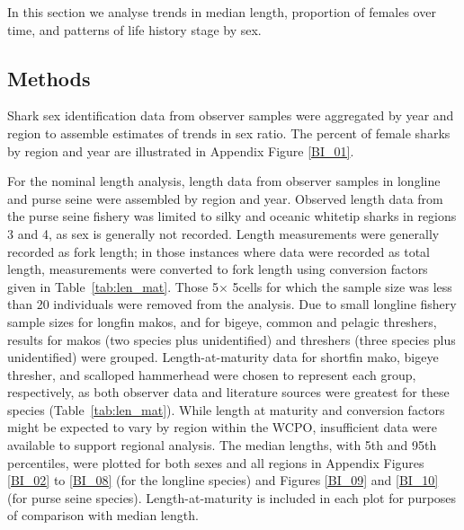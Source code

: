 \documentclass[12pt]{SCreport}
\begin{document}
In this section we analyse trends in median length, proportion of females over time, and patterns of life history stage by sex.  
      

\subsection{Methods}\label{bi:methods}
Shark sex identification data from observer samples were aggregated by year and region to assemble estimates of trends in sex ratio.  The percent of female sharks by region and year are illustrated in Appendix Figure \ref{BI_01}.
  
For the nominal length analysis, length data from observer samples in longline and purse seine were assembled by region and year.  Observed length data from the purse seine fishery was limited to silky and oceanic whitetip sharks in regions 3 and 4, as sex is generally not recorded.  Length measurements were generally recorded as fork length; in those instances where data were recorded as total length, measurements were converted to fork length using conversion factors given in Table~\ref{tab:len_mat}. Those 5\degree $\times$ 5\degree cells for which the sample size was less than 20 individuals were removed from the analysis.  Due to small longline fishery sample sizes for longfin makos, and for bigeye, common and pelagic threshers, results for makos (two species plus unidentified) and threshers (three species plus unidentified) were grouped. Length-at-maturity data for shortfin mako, bigeye thresher, and scalloped hammerhead were chosen to represent each group, respectively, as both observer data and literature sources were greatest for these species (Table~\ref{tab:len_mat}). While length at maturity and conversion factors might be expected to vary by region within the WCPO, insufficient data were available to support regional analysis. The median lengths, with 5th and 95th percentiles, were plotted for both sexes and all regions in Appendix Figures \ref{BI_02} to \ref{BI_08} (for the longline species) and Figures \ref{BI_09} and \ref{BI_10} (for purse seine species).  Length-at-maturity is included in each plot for purposes of comparison with median length.
\end{document}
